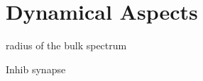 \chapter{Dynamical Aspects}\label{ch:dynamical_aspects}



% 
% 




radius of the bulk spectrum




Inhib synapse








